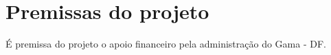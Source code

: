 \section{Premissas do projeto}

  É premissa do projeto o apoio financeiro pela administração do Gama - DF.
  
